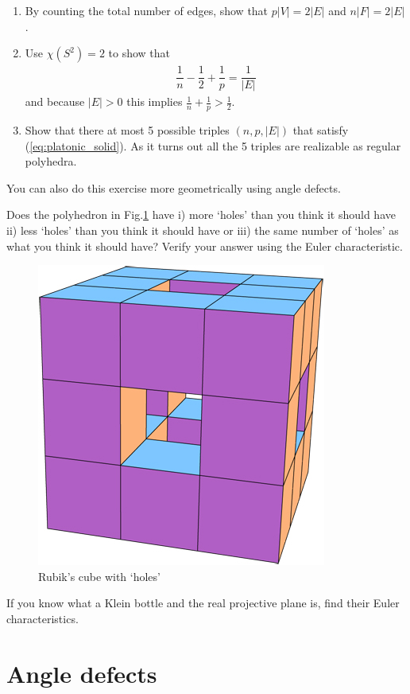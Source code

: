 \begin{exercise}
	\begin{enumerate}
		\item By counting the total number of edges, show that $ p |V| = 2 |E| $ and $ n |F| = 2|E| $.
		\item Use $\chi(S^2) = 2$ to show that
		      \begin{align}\label{eq:platonic_solid}
		      	\dfrac{1}{n} - \dfrac{1}{2} + \dfrac{1}{p} = \dfrac{1}{|E|}
		      \end{align}
		      and because $ |E| > 0 $ this implies $ \frac{1}{n} + \frac{1}{p} >  \frac{1}{2}$.
		\item Show that there at most 5 possible triples $ (n, p, |E|)$ that satisfy (\ref{eq:platonic_solid}). As it turns out all the 5 triples are realizable as regular polyhedra.
	\end{enumerate}
	You can also do this exercise more geometrically using angle defects.
\end{exercise}

\begin{exercise}
	Does the polyhedron in Fig.\ref{rubik} have i) more `holes' than you think it should have ii) less `holes' than you think it should have or iii) the same number of `holes' as what you think it should have? Verify your answer using the Euler characteristic.
\end{exercise}
\begin{figure}[H]
	\centering
	\includegraphics[width=0.15\linewidth]{images/cube_with_holes}
	\caption{Rubik's cube with `holes'}
	\label{rubik}
\end{figure}

\begin{exercise}
	If you know what a Klein bottle and the real projective plane is, find their Euler characteristics.
\end{exercise}

\section{Angle defects}

